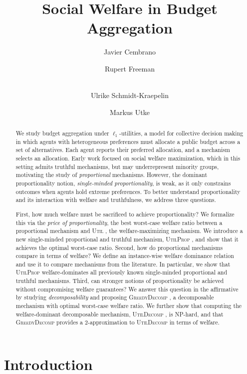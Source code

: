 \documentclass[11pt]{article}
\author[1]{Javier Cembrano}
\author[2]{Rupert Freeman}
\author[3]{\\ Ulrike Schmidt-Kraepelin}
\author[3]{Markus Utke}
\affil[1]{Universidad de Chile, Santiago, Chile}
\affil[2]{Darden School of Business, University of Virginia, VA, USA}
\affil[3]{TU Eindhoven, The Netherlands}
\title{Social Welfare in Budget Aggregation}
\date{}
\newcommand{\Ut}{\textsc{Util} }
\newcommand{\UtP}{\textsc{UtilProp} }
\newcommand{\GrdDec}{\textsc{GreedyDecomp} }
\newcommand{\UtDec}{\textsc{UtilDecomp} }
\begin{document}
\begin{titlepage}

\maketitle
\vspace{0.0cm}
\begin{abstract}
We study budget aggregation under $\ell_1$-utilities, a model for collective decision making in which agents with heterogeneous preferences must allocate a public budget across a set of alternatives. Each agent reports their preferred allocation, and a mechanism selects an allocation. Early work focused on social welfare maximization, which in this setting admits truthful mechanisms, but may underrepresent minority groups, motivating the study of \emph{proportional} mechanisms. However, the dominant proportionality notion, \emph{single-minded proportionality}, is weak, as it only constrains outcomes when agents hold extreme preferences. To better understand proportionality and its interaction with welfare and truthfulness, we address three questions.

First, how much welfare must be sacrificed to achieve proportionality? We formalize this via the \emph{price of proportionality}, the best worst-case welfare ratio between a proportional mechanism and \Ut, the welfare-maximizing mechanism. We introduce a new single-minded proportional and truthful mechanism, \UtP, and show that it achieves the optimal worst-case ratio. Second, how do proportional mechanisms compare in terms of welfare? We define an instance-wise welfare dominance relation and use it to compare mechanisms from the literature. In particular, we show that \UtP welfare-dominates all previously known single-minded proportional and truthful mechanisms. Third, can stronger notions of proportionality be achieved without compromising welfare guarantees? We answer this question in the affirmative by studying \emph{decomposability} and proposing \GrdDec, a decomposable mechanism with optimal worst-case welfare ratio. We further show that computing the welfare-dominant decomposable mechanism, \UtDec, is NP-hard, and that \GrdDec provides a $2$-approximation to \UtDec in terms of welfare.
\end{abstract}

\end{titlepage}



\section{Introduction}
\end{document}
